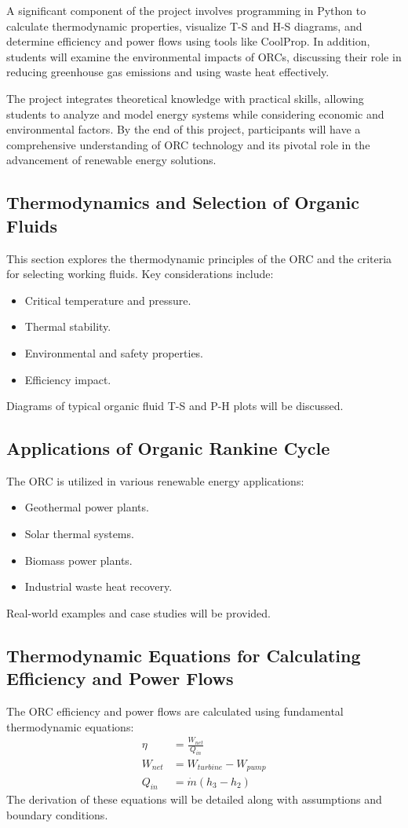 \documentclass[11pt]{article}
\begin{document}
A significant component of the project involves programming in Python to calculate thermodynamic properties, visualize T-S and H-S diagrams, and determine efficiency and power flows using tools like CoolProp. In addition, students will examine the environmental impacts of ORCs, discussing their role in reducing greenhouse gas emissions and using waste heat effectively.

The project integrates theoretical knowledge with practical skills, allowing students to analyze and model energy systems while considering economic and environmental factors. By the end of this project, participants will have a comprehensive understanding of ORC technology and its pivotal role in the advancement of renewable energy solutions. 


\subsection{Thermodynamics and Selection of Organic Fluids}
This section explores the thermodynamic principles of the ORC and the criteria for selecting working fluids. Key considerations include:
\begin{itemize}
    \item Critical temperature and pressure.
    \item Thermal stability.
    \item Environmental and safety properties.
    \item Efficiency impact.
\end{itemize}
Diagrams of typical organic fluid T-S and P-H plots will be discussed.

\subsection{Applications of Organic Rankine Cycle}
The ORC is utilized in various renewable energy applications:
\begin{itemize}
    \item Geothermal power plants.
    \item Solar thermal systems.
    \item Biomass power plants.
    \item Industrial waste heat recovery.
\end{itemize}
Real-world examples and case studies will be provided.

\subsection{Thermodynamic Equations for Calculating Efficiency and Power Flows}
The ORC efficiency and power flows are calculated using fundamental thermodynamic equations:
\begin{align}
    \eta &= \frac{W_{net}}{Q_{in}} \\
    W_{net} &= W_{turbine} - W_{pump} \\
    Q_{in} &= \dot{m}(h_3 - h_2)
\end{align}
The derivation of these equations will be detailed along with assumptions and boundary conditions.
\end{document}
